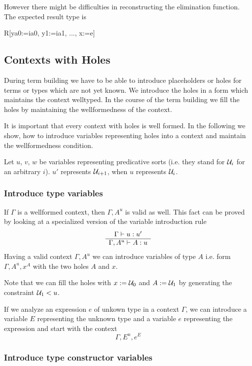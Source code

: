 However there might be difficulties in reconstructing the elimination function.
The expected result type is
\begin{alba}
    R[ya0:=ia0, y1:=ia1, ..., x:=e]
\end{alba}








\subsection{Contexts with Holes}

During term building we have to be able to introduce placeholders or holes for
terms or types which are not yet known. We introduce the holes in a form which
maintains the context welltyped. In the course of the term building we fill the
holes by maintaining the wellformedness of the context.

It is important that every context with holes is well formed. In the following
we show, how to introduce variables representing holes into a context and
maintain the wellformedness condition.

Let $u$, $v$, $w$ be variables representing predicative sorts (i.e. they stand
for ${\cal{U}}_i$ for an arbitrary $i$). $u'$ represents ${\cal{U}}_{i+1}$, when $u$
represents ${\cal{U}}_i$.


\subsubsection{Introduce type variables}

If $\Gamma$ is a wellformed context, then $\Gamma, A^u$ is valid as well. This
fact can be proved by looking at a specialized version of the variable
introduction rule
%
$$
\begin{array}{c} \Gamma \vdash u: u' \\ \hline \Gamma, A^u \vdash A: u\end{array}
$$
%
Having a valid context $\Gamma,A^u$ we can introduce variables of type $A$ i.e.
form $\Gamma, A^u, x^A$ with the two holes $A$ and $x$.

Note that we can fill the holes with $x := {\cal{U}}_0$ and $A := {\cal{U}}_1$ by
generating the constraint ${\cal{U}}_1 < u$.

If we analyze an expression $e$ of unkown type in a context $\Gamma$, we can
introduce a variable $E$ representing the unknown type and a variable $e$
representing the expression and start with the context
%
$$
\Gamma, E^u, e^E
$$




\subsubsection{Introduce type constructor variables}

